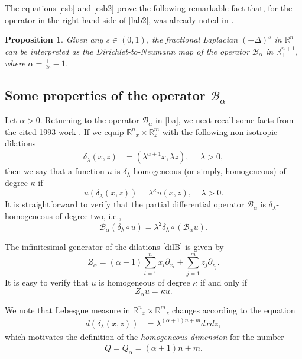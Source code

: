 \documentclass[11pt]{amsart}
\theoremstyle{plain}
\newtheorem{prop}[thrm]{Proposition}
\numberwithin{equation}{section}
\begin{document}
The equations \eqref{csb} and \eqref{csb2} prove the following remarkable fact that, for the operator in the right-hand side of \eqref{lab2}, was already noted in \cite{CS}.

\begin{prop}\label{P:flp}
Given any $s\in (0,1)$, the fractional Laplacian $(-\Delta)^s$ in ${\mathbb R^n}$ can  be interpreted as the Dirichlet-to-Neumann map of the operator ${\mathcal{B}_\alpha}$ in ${{\mathbb R}^{n+1}_+}$, where $\alpha = \frac{1}{2s} - 1$.
\end{prop}

\subsection{Some properties of the operator ${\mathcal{B}_\alpha}$}\label{S:sp}

 Let $\alpha >0$. Returning to the  operator ${\mathcal{B}_\alpha}$ in \eqref{ba}, we next recall some facts from the cited 1993 work \cite{G}. If we equip ${\mathbb R^n}_x\times {\mathbb R}_z^{m}$ with the following non-isotropic dilations
\begin{align}\label{dilB}
 \delta_\lambda(x,z)&=(\lambda^{\alpha+1}x, \lambda z),\ \ \ \ \ \ \lambda>0,
\end{align}
then we say that a function $u$ is $\delta_{\lambda}$-homogeneous (or simply, homogeneous) of degree $\kappa$ if
\[
u(\delta_{\lambda}(x,z)) = {\lambda}^\kappa u(x,z),\ \ \ \ \ {\lambda}>0.
\]
It is straightforward to verify that the partial differential operator ${\mathcal{B}_\alpha}$ is $\delta_{\lambda}$-homogeneous of degree two, i.e.,
\begin{equation*}
 {\mathcal{B}_\alpha}(\delta_\lambda \circ u)=\lambda^2\delta_\lambda\circ ({\mathcal{B}_\alpha} u).
\end{equation*}

The infinitesimal generator of the dilations \eqref{dilB} is given by
\begin{equation}\label{Zagen}
 Z_\alpha= (\alpha+1)\sum_{i=1}^n x_i \partial_{x_i} + \sum_{j=1}^m z_j\partial_{z_j}.
\end{equation}
It is easy to verify that $u$ is homogeneous of degree $\kappa$ if and only if
\begin{equation}\label{Zak}
{Z_\alpha} u = \kappa u.
\end{equation}

We note that Lebesgue measure in ${\mathbb R^n}_x\times {\mathbb R^m}_z$ changes according to the equation
\begin{align*}
 d(\delta_\lambda(x,z))&=\lambda^{(\alpha+1)n+ m} dx dz,
\end{align*}
which motivates the definition of the \emph{homogeneous dimension} for the number
\begin{align}\label{Qa}
 Q=Q_\alpha=(\alpha+1)n + m.
\end{align}
\end{document}
